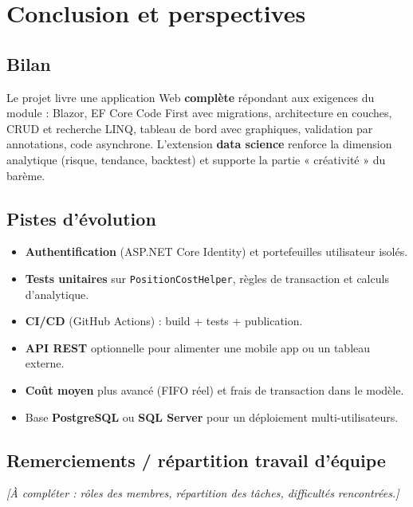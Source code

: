 \chapter{Conclusion et perspectives}
\label{ch:conc}

\section{Bilan}

Le projet livre une application Web \textbf{complète} répondant aux exigences du module : Blazor, EF Core Code First avec migrations, architecture en couches, CRUD et recherche LINQ, tableau de bord avec graphiques, validation par annotations, code asynchrone. L'extension \textbf{data science} renforce la dimension analytique (risque, tendance, backtest) et supporte la partie « créativité » du barème.

\section{Pistes d'évolution}

\begin{itemize}[leftmargin=*]
  \item \textbf{Authentification} (ASP.NET Core Identity) et portefeuilles utilisateur isolés.
  \item \textbf{Tests unitaires} sur \texttt{PositionCostHelper}, règles de transaction et calculs d'analytique.
  \item \textbf{CI/CD} (GitHub Actions) : build + tests + publication.
  \item \textbf{API REST} optionnelle pour alimenter une mobile app ou un tableau externe.
  \item \textbf{Coût moyen} plus avancé (FIFO réel) et frais de transaction dans le modèle.
  \item Base \textbf{PostgreSQL} ou \textbf{SQL Server} pour un déploiement multi-utilisateurs.
\end{itemize}

\section{Remerciements / répartition travail d'équipe}

\textit{[À compléter : rôles des membres, répartition des tâches, difficultés rencontrées.]}
